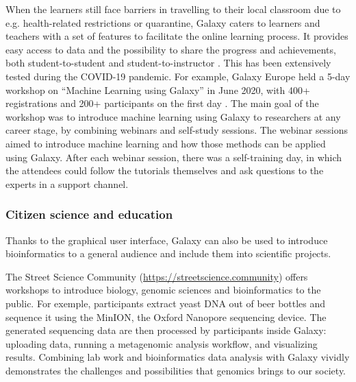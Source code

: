 \documentclass[10pt,letterpaper]{article}
\begin{document}
When the learners still face barriers in travelling to their local classroom due to e.g. health-related restrictions or quarantine, Galaxy caters to learners and teachers with a set of features to facilitate the online learning process. It provides easy access to data and the possibility to share the progress and achievements, both student-to-student and student-to-instructor \cite{SerranoSolano2020}. This has been extensively tested during the COVID-19 pandemic. For example, Galaxy Europe held a 5-day workshop on ``Machine Learning using Galaxy'' in June 2020, with 400+ registrations and 200+ participants on the first day \cite{FreiburgGalaxyTeam2020}. The main goal of the workshop was to introduce machine learning using Galaxy to researchers at any career stage, by combining webinars and self-study sessions. The webinar sessions aimed to introduce machine learning and how those methods can be applied using Galaxy. After each webinar session, there was a self-training day, in which the attendees could follow the tutorials themselves and ask questions to the experts in a support channel.

\subsubsection*{Citizen science and education}

Thanks to the graphical user interface, Galaxy can also be used to introduce bioinformatics to a general audience and include them into scientific projects.

The Street Science Community (\url{https://streetscience.community}) offers workshops to introduce biology, genomic sciences and bioinformatics to the public. For exemple, participants extract yeast DNA out of beer bottles and sequence it using the MinION, the Oxford Nanopore sequencing device. The generated sequencing data are then processed by participants inside Galaxy: uploading data, running a metagenomic analysis workflow, and visualizing results. Combining lab work and bioinformatics data analysis with Galaxy vividly demonstrates the challenges and possibilities that genomics brings to our society.
\end{document}
